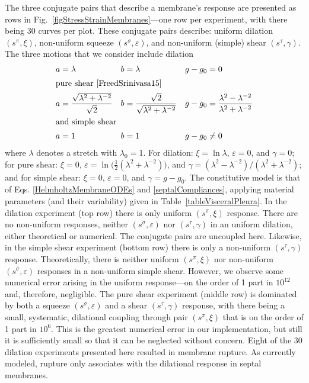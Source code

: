 The three conjugate pairs that describe a membrane's response are presented as rows in Fig.~\ref{figStressStrainMembranes}---one row per experiment, with there being 30 curves per plot.  These conjugate pairs describe: uniform dilation $( s^{\pi} , \xi )$, non-uniform squeeze $( s^{\sigma} , \varepsilon )$, and non-uniform (simple) shear $( s^{\tau} , \gamma )$.  The three motions that we consider include \newline dilation
\begin{subequations}
    \label{membraneExperiments}
    \begin{align}
    a & = \lambda & b & = \lambda & g - g_0 & = 0 
    \label{dilationExperiment}\\
    \intertext{pure shear \cite{FreedSrinivasa15}}
    a & = \frac{\sqrt{\lambda^2 + \lambda^{-2}}}{\sqrt{2}} & 
    b & = \frac{\sqrt{2}}{\sqrt{\lambda^2 + \lambda^{-2}}} & g - g_0 &  = 
    \frac{\lambda^2 - \lambda^{-2}}{\lambda^2 + \lambda^{-2}} 
    \label{pureShearExperiment} \\
    \intertext{and simple shear}
    a & = 1 & b & = 1 & g - g_0 & \neq 0
    \label{simpleShearExperiment}
    \end{align}
\end{subequations}
where $\lambda$ denotes a stretch with $\lambda_0 = 1$.  For dilation: $\xi = \ln \lambda$, $\varepsilon = 0$, and $\gamma = 0$; for pure shear: $\xi = 0$, $\varepsilon = \ln \bigl( \tfrac{1}{2} ( \lambda^2 + \lambda^{-2}) \bigr)$, and $\gamma = ( \lambda^2 - \lambda^{-2} ) / (\lambda^2 + \lambda^{-2})$; and for simple shear: $\xi = 0$, $\varepsilon = 0$, and $\gamma = g - g_0$.  The constitutive model is that of Eqs. \ref{HelmholtzMembraneODEs} and \ref{septalCompliances}, applying material parameters (and their variability) given in Table~\ref{tableVisceralPleura}.  In the dilation experiment (top row) there is only uniform $( s^{\pi} \! , \xi)$ response.  There are no non-uniform responses, neither $( s^{\sigma} \! , \varepsilon)$ nor $( s^{\tau} \! , \gamma)$ in an uniform dilation, either theoretical or numerical.  The conjugate pairs are uncoupled here.  Likewise, in the simple shear experiment (bottom row) there is only a non-uniform $( s^{\tau} \! , \gamma)$ response.  Theoretically, there is neither uniform $( s^{\pi} \! , \xi)$ nor non-uniform $( s^{\sigma} \! , \varepsilon)$ responses in a non-uniform simple shear.  However, we observe some numerical error arising in the uniform response---on the order of 1 part in $10^{12}$ and, therefore, negligible.  The pure shear experiment (middle row) is dominated by both a squeeze $( s^{\sigma} \! , \varepsilon)$ and a shear  $( s^{\tau} \! , \gamma)$ response, with there being a small, systematic, dilational coupling through pair $( s^{\pi} \! , \xi)$ that is on the order of 1 part in $10^6$.  This is the greatest numerical error in our implementation, but still it is sufficiently small so that it can be neglected without concern.  Eight of the 30 dilation experiments presented here resulted in membrane rupture.  As currently modeled, rupture only associates with the dilational response in septal membranes.

